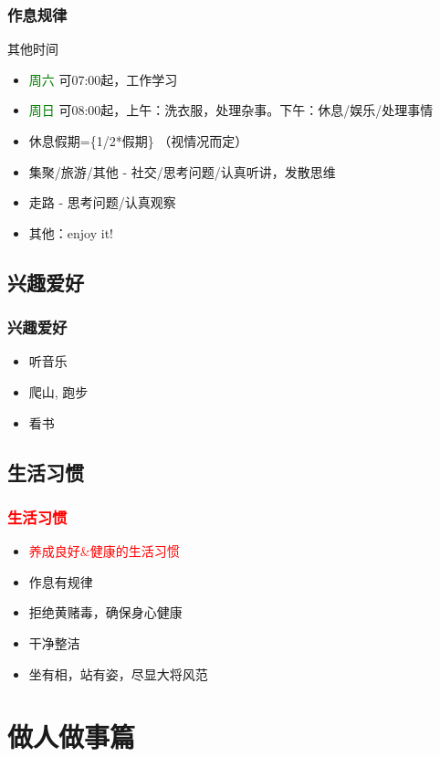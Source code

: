 \begin{frame}
	\frametitle{作息规律}
	\begin{alertblock}{其他时间}
    \begin{itemize}
    \item \textcolor{green}{周六} 可07:00起，工作学习
    \item \textcolor{green}{周日} 可08:00起，上午：洗衣服，处理杂事。下午：休息/娱乐/处理事情
    \item 休息假期=\{1/2*假期\} （视情况而定）
    \item 集聚/旅游/其他 - 社交/思考问题/认真听讲，发散思维
    \item 走路 - 思考问题/认真观察
    \item 其他：enjoy it!
    \end{itemize}
    \end{alertblock}
\end{frame}

\subsection{兴趣爱好}
\begin{frame}
\frametitle{兴趣爱好}
\begin{itemize}
    \item 听音乐
    \item 爬山, 跑步
    \item 看书
\end{itemize}
\end{frame}

\subsection{生活习惯}
\begin{frame}
\frametitle{\textcolor{red}{生活习惯}}
\begin{itemize}
    \item \textcolor{red}{养成良好\&健康的生活习惯}
    \item 作息有规律
    \item 拒绝黄赌毒，确保身心健康
    \item 干净整洁
    \item 坐有相，站有姿，尽显大将风范
\end{itemize}
\end{frame}

\section{做人做事篇}
